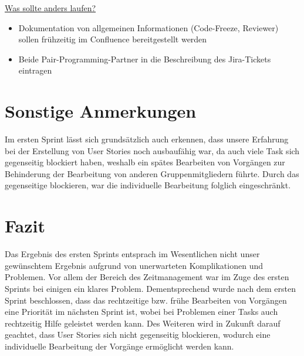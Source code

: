 \documentclass[12pt,a4paper, oneside]{article}
\begin{document}
    \underline{Was sollte anders laufen?}
    \begin{itemize}
        \item Dokumentation von allgemeinen Informationen (Code-Freeze, Reviewer) sollen frühzeitig im Confluence bereitgestellt werden
        \item Beide Pair-Programming-Partner in die Beschreibung des Jira-Tickets eintragen
    \end{itemize}


    \section{Sonstige Anmerkungen}
    Im ersten Sprint lässt sich grundsätzlich auch erkennen, dass unsere Erfahrung bei der Erstellung von User Stories noch ausbaufähig war, da auch viele Task sich gegenseitig blockiert haben, weshalb ein spätes Bearbeiten von Vorgängen zur Behinderung der Bearbeitung von anderen Gruppenmitgliedern führte. Durch das gegenseitige blockieren, war die individuelle Bearbeitung folglich eingeschränkt.


    \section{Fazit}
    Das Ergebnis des ersten Sprints entsprach im Wesentlichen nicht unser gewünschtem Ergebnis aufgrund von unerwarteten Komplikationen und Problemen. Vor allem der Bereich des Zeitmanagement war im Zuge des ersten Sprints bei einigen ein klares Problem. Dementsprechend wurde nach dem ersten Sprint beschlossen, dass das rechtzeitige bzw. frühe Bearbeiten von Vorgängen eine Priorität im nächsten Sprint ist, wobei bei Problemen einer Tasks auch rechtzeitig Hilfe geleistet werden kann. Des Weiteren wird in Zukunft darauf geachtet, dass User Stories sich nicht gegenseitig blockieren, wodurch eine individuelle Bearbeitung der Vorgänge ermöglicht werden kann.
\end{document}
